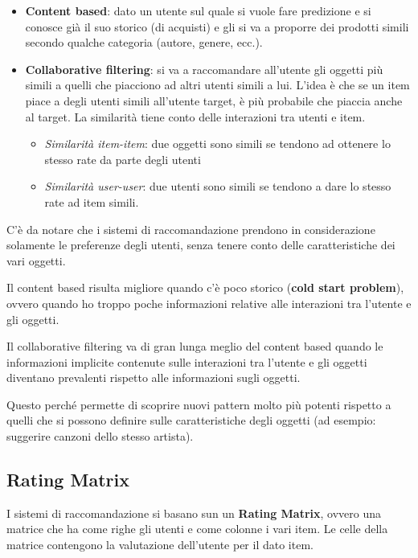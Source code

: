 \begin{itemize}
\item
  \textbf{Content based}: dato un utente sul quale si vuole fare
  predizione e si conosce già il suo storico (di acquisti) e gli si va a
  proporre dei prodotti simili secondo qualche categoria (autore,
  genere, ecc.).
\item
  \textbf{Collaborative filtering}: si va a raccomandare all'utente gli oggetti
  più simili a quelli che piacciono ad altri utenti simili a lui.
  L'idea è che se un item piace a degli utenti simili all'utente target,
  è più probabile che piaccia anche al target. La similarità tiene conto
  delle interazioni tra utenti e item.

  \begin{itemize}
  \item
    \textit{Similarità item-item}: due oggetti sono simili se tendono ad ottenere
    lo stesso rate da parte degli utenti
  \item
    \textit{Similarità user-user}: due utenti sono simili se tendono a dare lo
    stesso rate ad item simili.
  \end{itemize}
\end{itemize}

C'è da notare che i sistemi di raccomandazione prendono in considerazione solamente le preferenze degli utenti, senza tenere conto delle caratteristiche dei vari oggetti.

Il content based risulta migliore quando c'è poco storico (\textbf{cold
start problem}), ovvero quando ho troppo poche informazioni relative
alle interazioni tra l'utente e gli oggetti.

Il collaborative filtering va di gran lunga meglio del content based
quando le informazioni implicite contenute sulle interazioni tra
l'utente e gli oggetti diventano prevalenti rispetto alle informazioni
sugli oggetti. 

Questo perché permette di scoprire nuovi pattern molto
più potenti rispetto a quelli che si possono definire sulle
caratteristiche degli oggetti (ad esempio: suggerire canzoni dello
stesso artista).

\subsection{Rating Matrix}\label{rating-matrix}

I sistemi di raccomandazione si basano sun un \textbf{Rating Matrix}, ovvero una matrice che ha come righe gli utenti e come colonne i vari item. 
Le celle della matrice contengono la valutazione dell'utente per il dato
item.

